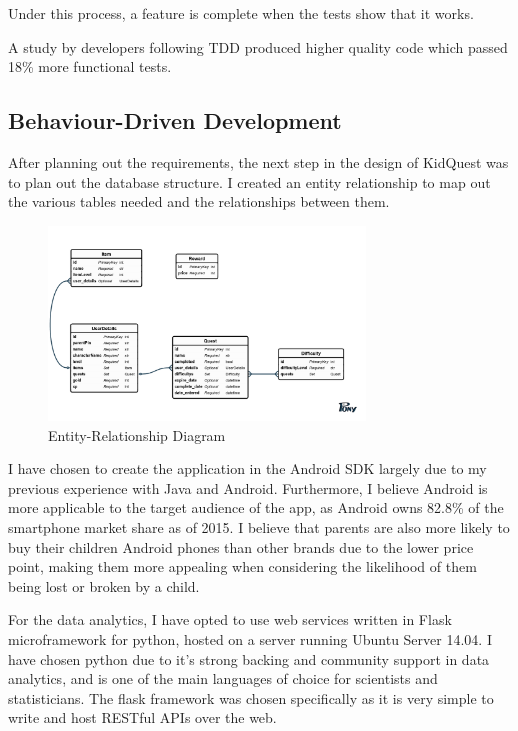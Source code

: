 Under this process, a feature is complete when the tests show that it works.

A study by \cite{George:2003:IIT:952532.952753} developers following TDD produced higher quality code which passed 18\% more functional tests.



\subsection{Behaviour-Driven Development}



After planning out the requirements, the next step in the design of KidQuest was to plan out the database structure.
I created an entity relationship to map out the various tables needed and the relationships between them.

\begin{figure}[t]
	\centering
	\includegraphics[width=0.75\textwidth]{images/entityRelationshipDiagram.png}
	\caption{Entity-Relationship Diagram}
	\label{fig:ERD}
\end{figure}

I have chosen to create the application in the Android SDK largely due to my previous experience with Java and Android. 
Furthermore, I believe Android is more applicable to the target audience of the app, as Android owns 82.8\% of the smartphone market share as of 2015.
I believe that parents are also more likely to buy their children Android phones than other brands due to the lower price point, making them more appealing when considering the likelihood of them being lost or broken by a child.

For the data analytics, I have opted to use web services written in Flask microframework for python, hosted on a server running Ubuntu Server 14.04. 
I have chosen python due to it's strong backing and community support in data analytics, and is one of the main languages of choice for scientists and statisticians.
The flask framework was chosen specifically as it is very simple to write and host RESTful APIs over the web.

